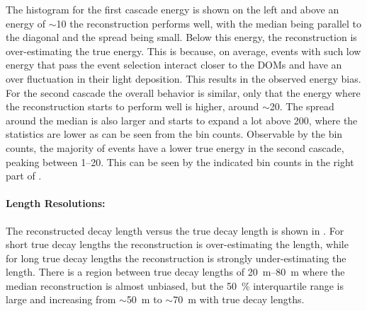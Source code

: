 
The histogram for the first cascade energy is shown on the left and above an energy of $\sim$\SI{10}{\gev} the reconstruction performs well, with the median being parallel to the diagonal and the spread being small. Below this energy, the reconstruction is over-estimating the true energy. This is because, on average, events with such low energy that pass the event selection interact closer to the DOMs and have an over fluctuation in their light deposition. This results in the observed energy bias. For the second cascade the overall behavior is similar, only that the energy where the reconstruction starts to perform well is higher, around $\sim$\SI{20}{\gev}. The spread around the median is also larger and starts to expand a lot above \SI{200}{\gev}, where the statistics are lower as can be seen from the bin counts. Observable by the bin counts, the majority of events have a lower true energy in the second cascade, peaking between \SIrange[range-phrase=~and~]{1}{20}{\gev}. This can be seen by the indicated bin counts in the right part of .


\paragraph{Length Resolutions:}


The reconstructed decay length versus the true decay length is shown in . For short true decay lengths the reconstruction is over-estimating the length, while for long true decay lengths the reconstruction is strongly under-estimating the length. There is a region between true decay lengths of \SIrange[range-phrase=~and~]{20}{80}{\meter} where the median reconstruction is almost unbiased, but the \SI{50}{\percent} interquartile range is large and increasing from $\sim$\SI{50}{\meter} to $\sim$\SI{70}{\meter} with true decay lengths.

